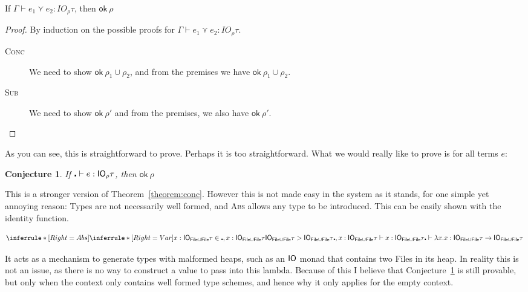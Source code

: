 \begin{theorem}\label{theorem:conc}
  If $\Gamma \vdash e_1 \curlyvee e_2 : IO_\rho \tau$, then $\textsf{ok} \ \rho$
\end{theorem}
\begin{proof}
  By induction on the possible proofs for $\Gamma \vdash e_1 \curlyvee e_2 : IO_\rho \tau$.
  \begin{description}
  \item[\rm\textsc{Conc}]
    We need to show $\textsf{ok} \ \rho_1 \cup \rho_2$, and from the premises we have $\textsf{ok} \ \rho_1 \cup \rho_2$.
  \item[\rm\textsc{Sub}]
    We need to show $\textsf{ok} \ \rho'$ and from the premises, we also have $\textsf{ok} \ \rho'$. 
  \end{description}
\end{proof}
As you can see, this is straightforward to prove. Perhaps it is too
straightforward. What we would really like to prove is for all terms
$e$:
\newtheorem{conjecture}{Conjecture}
\begin{conjecture}\label{conjecture:strongconc}
  If $\centerdot \vdash e : \mathsf{IO}_\rho \tau$, then $\textsf{ok} \ \rho$
\end{conjecture}
This is a stronger version of Theorem~\ref{theorem:conc}. However this
is not made easy in the system as it stands, for one simple yet
annoying reason: Types are not necessarily well formed, and
\textsc{Abs} allows any type to be introduced. This can be easily
shown with the identity function.

\[
  \inferrule*[Right=Abs]{
  \inferrule*[Right=Var]{x : \IO_{\textsf{File} \cup \textsf{File}} \tau  \in
    \centerdot , x : \IO_{\textsf{File} \cup \textsf{File}} \tau \\  \IO_{\textsf{File} \cup \textsf{File}} \tau >
    \IO_{\textsf{File} \cup \textsf{File}} \tau }{\centerdot , x : \IO_{\textsf{File} \cup
      \textsf{File}} \tau \vdash x : \IO_{\textsf{File} \cup \textsf{File}} \tau}
}
{\centerdot \vdash \lambda x . x : \IO_{\textsf{File} \cup \textsf{File}} \tau \rightarrow \IO_{\textsf{File} \cup \textsf{File}} \tau}
\]

It acts as a mechanism to generate types with malformed heaps, such as
an $\mathsf{IO}$ monad that contains two \textsf{File}s in its heap.  In
reality this is not an issue, as there is no way to construct a value
to pass into this lambda. Because of this I believe that Conjecture~\ref{conjecture:strongconc} is still
provable, but only when the context only contains well formed type
schemes, and hence why it only applies for the empty context.

